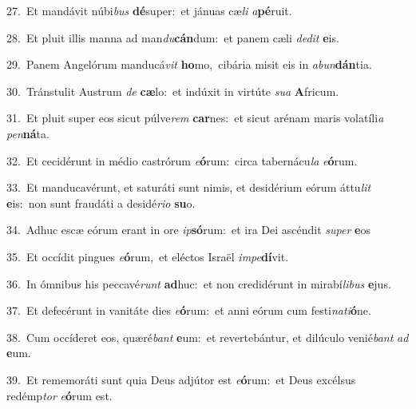 {\numbfont\textcolor{\numbcolor}{27.}}~Et mandávit núbi\textit{bus} \textbf{dé}\-super:~\star et jánuas cæ\textit{li} \textit{a}\-\textbf{pé}ruit.\par
{\numbfont\textcolor{\numbcolor}{28.}}~Et pluit illis manna ad man\-\textit{du}\-\textbf{cán}dum:~\star et panem cæli \textit{de}\-\textit{dit} \textbf{e}\-is.\par
{\numbfont\textcolor{\numbcolor}{29.}}~Panem Angelórum manducá\textit{vit} \textbf{ho}\-mo,~\star cibária misit eis in \textit{ab}\-\textit{un}\textbf{dán}tia.\par
{\numbfont\textcolor{\numbcolor}{30.}}~Tránstulit Austrum \textit{de} \textbf{cæ}\-lo:~\star et indúxit in virtúte \textit{su}\-\textit{a} \textbf{A}\-fricum.\par
{\numbfont\textcolor{\numbcolor}{31.}}~Et pluit super eos sicut púlve\textit{rem} \textbf{car}\-nes:~\star et sicut arénam maris volatíli\textit{a} \textit{pen}\-\textbf{ná}ta.\par
{\numbfont\textcolor{\numbcolor}{32.}}~Et cecidérunt in médio castrórum \textit{e}\-\textbf{ó}rum:~\star circa tabernácu\textit{la} \textit{e}\-\textbf{ó}rum.\par
{\numbfont\textcolor{\numbcolor}{33.}}~Et manducavérunt, et saturáti sunt nimis, et desidérium eórum áttu\textit{lit} \textbf{e}\-is:~\star non sunt fraudáti a desidé\-\textit{ri}\-\textit{o} \textbf{su}\-o.\par
{\numbfont\textcolor{\numbcolor}{34.}}~Adhuc escæ eórum erant in ore \textit{ip}\-\textbf{só}rum:~\star et ira Dei ascéndit \textit{su}\-\textit{per} \textbf{e}\-os\par
{\numbfont\textcolor{\numbcolor}{35.}}~Et occídit pingues \textit{e}\-\textbf{ó}rum,~\star et eléctos Israël \textit{im}\-\textit{pe}\textbf{dí}vit.\par
{\numbfont\textcolor{\numbcolor}{36.}}~In ómnibus his peccavé\textit{runt} \textbf{ad}\-huc:~\star et non credidérunt in mirabí\-\textit{li}\-\textit{bus} \textbf{e}\-jus.\par
{\numbfont\textcolor{\numbcolor}{37.}}~Et defecérunt in vanitáte dies \textit{e}\-\textbf{ó}rum:~\star et anni eórum cum festi\-\textit{na}\-\textit{ti}\textbf{ó}ne.\par
{\numbfont\textcolor{\numbcolor}{38.}}~Cum occíderet eos, quæré\textit{bant} \textbf{e}\-um:~\star et revertebántur, et dilúculo venié\textit{bant} \textit{ad} \textbf{e}\-um.\par
{\numbfont\textcolor{\numbcolor}{39.}}~Et rememoráti sunt quia Deus adjútor est \textit{e}\-\textbf{ó}rum:~\star et Deus excélsus redémp\textit{tor} \textit{e}\-\textbf{ó}rum est.\par
